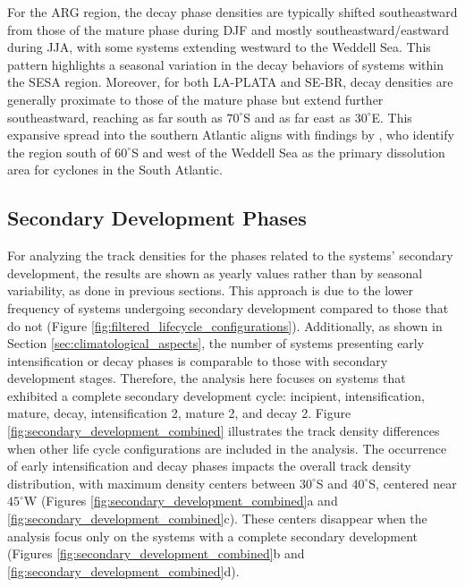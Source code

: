 For the ARG region, the decay phase densities are typically shifted southeastward from those of the mature phase during DJF and mostly southeastward/eastward during JJA, with some systems extending westward to the Weddell Sea. This pattern highlights a seasonal variation in the decay behaviors of systems within the SESA region. Moreover, for both LA-PLATA and SE-BR, decay densities are generally proximate to those of the mature phase but extend further southeastward, reaching as far south as \(70^\circ\)S and as far east as \(30^\circ\)E. This expansive spread into the southern Atlantic aligns with findings by \citet{hoskins2005new}, who identify the region south of \(60^\circ\)S and west of the Weddell Sea as the primary dissolution area for cyclones in the South Atlantic.


\subsection{Secondary Development Phases}\label{sec:secondary_development}

For analyzing the track densities for the phases related to the systems' secondary development, the results are shown as yearly values rather than by seasonal variability, as done in previous sections. This approach is due to the lower frequency of systems undergoing secondary development compared to those that do not (Figure \ref{fig:filtered_lifecycle_configurations}). Additionally, as shown in Section \ref{sec:climatological_aspects}, the number of systems presenting early intensification or decay phases is comparable to those with secondary development stages. Therefore, the analysis here focuses on systems that exhibited a complete secondary development cycle: incipient, intensification, mature, decay, intensification 2, mature 2, and decay 2. Figure \ref{fig:secondary_development_combined} illustrates the track density differences when other life cycle configurations are included in the analysis. The occurrence of early intensification and decay phases impacts the overall track density distribution, with maximum density centers between \(30^\circ\)S and \(40^\circ\)S, centered near \(45^\circ\)W (Figures \ref{fig:secondary_development_combined}a and \ref{fig:secondary_development_combined}c). These centers disappear when the analysis focus only on the systems with a complete secondary development (Figures \ref{fig:secondary_development_combined}b and \ref{fig:secondary_development_combined}d).

